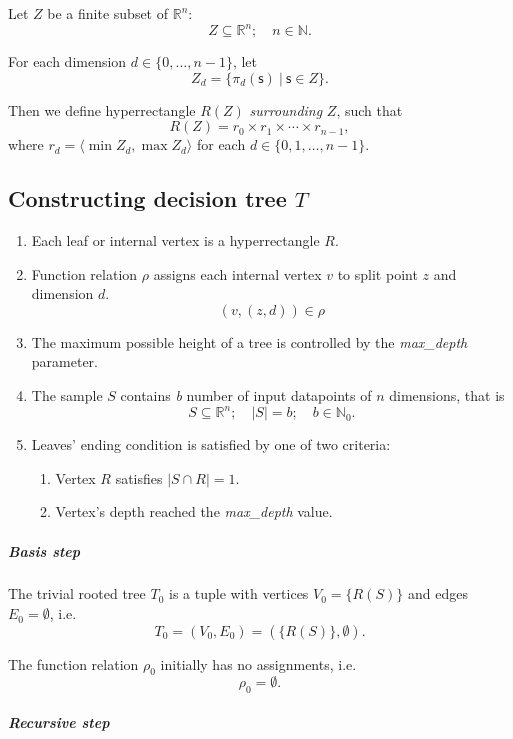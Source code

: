 \begin{definition}
Let $Z$ be a finite subset of $\mathbb{R}^n$:
$$Z \subseteq \mathbb{R}^n ;\quad n \in \mathbb{N}.$$

For each dimension \(d \in\{0, \dots, n - 1\}\), let
$$Z_d = \{ \pi_d(\mathsf{s})\ |\ \mathsf{s} \in Z \}.$$

Then we define hyperrectangle $R(Z)$ \emph{surrounding} $Z$, such that
$$R(Z) = r_0 \times r_1 \times \cdots \times r_{n-1},$$ where $r_d = \langle \min Z_d, \max Z_d \rangle$ for each $d \in \{0,1, \dots, n-1\}.$

\end{definition}


\subsection{Constructing decision tree $T$}

\begin{enumerate}

    \item Each leaf or internal vertex is a hyperrectangle $R$. 
    \item Function relation $\rho$ assigns each internal vertex $v$ to split point $z$ and dimension $d$.
    $$(v, (z,d)) \in \rho$$
    \item The maximum possible height of a tree is controlled by the \emph{max\_depth} parameter.
    \item The sample \(S\) contains \emph{b} number of input datapoints of $n$ dimensions, that is
    $$S \subseteq \mathbb{R}^n ;\quad |S| = b; \quad b \in \mathbb{N}_0.$$
    \item Leaves' ending condition is satisfied by one of two criteria: 
\begin{enumerate}
    \item Vertex \(R\) satisfies \(| S \cap R | = 1\).
    \item Vertex's depth reached the \emph{max\_depth} value.
\end{enumerate}
\end{enumerate}


\subparagraph{Basis step}

The trivial rooted tree \(T_0\) is a tuple with
vertices \(V_0 = \{R(S)\}\) and edges \(E_0 = \emptyset\), i.e. 
\[T_0= (V_0, E_0) = (\{R(S)\},\emptyset).\]

The function relation $\rho_0$ initially has no assignments, i.e.
$$\rho_0 = \emptyset.$$

\subparagraph{Recursive step}

